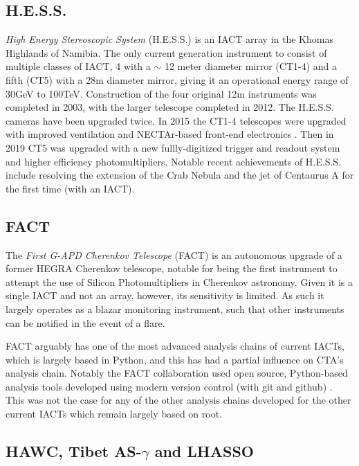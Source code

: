 \subsection{H.E.S.S.}
\textit{High Energy Stereoscopic System} (H.E.S.S.) is an IACT array in the Khomas Highlands of Namibia. The only current generation instrument to consist of multiple classes of IACT, 4 with a $\sim$ 12 meter diameter mirror (CT1-4) and a fifth (CT5) with a 28m diameter mirror, giving it an operational energy range of 30GeV to 100TeV. Construction of the four original 12m instruments was completed in 2003, with the larger telescope completed in 2012. The H.E.S.S. cameras have been upgraded twice. In 2015 the CT1-4 telescopes were upgraded with improved ventilation and NECTAr-based front-end electronics \cite{hess1u}. Then in 2019 CT5 was upgraded with a new fullly-digitized trigger and readout system and higher efficiency photomultipliers. Notable recent achievements of H.E.S.S. include resolving the extension of the Crab Nebula \cite{crabextension} and the jet of Centaurus A \cite{cena} for the first time (with an IACT).

\subsection{FACT}
The \textit{First G-APD Cherenkov Telescope} (FACT) is an autonomous upgrade of a former HEGRA Cherenkov telescope, notable for being the first instrument to attempt the use of Silicon Photomultipliers in Cherenkov astronomy. Given it is a single IACT and not an array, however, its sensitivity is limited. As such it largely operates as a blazar monitoring instrument, such that other instruments can be notified in the event of a flare. 

FACT arguably has one of the most advanced analysis chains of current IACTs, which is largely based in Python, and this has had a partial influence on CTA's analysis chain. Notably the FACT collaboration used open source, Python-based analysis tools developed using modern version control (with git and github) \cite{factspec}. This was not the case for any of the other analysis chains developed for the other current IACTs which remain largely based on root.

\subsection{HAWC, Tibet AS-\ensuremath{\gamma} and LHASSO}

